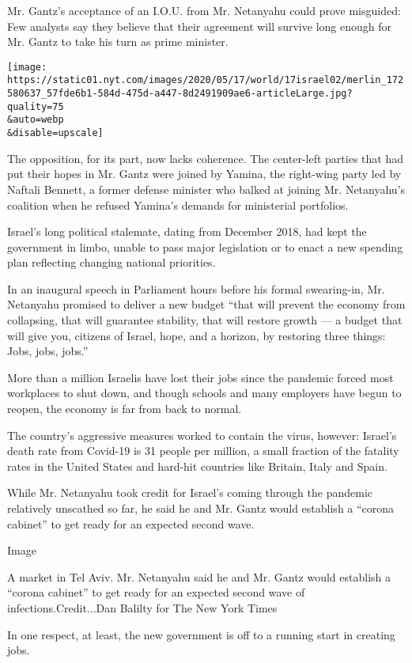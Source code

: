 Mr. Gantz's acceptance of an I.O.U. from Mr. Netanyahu could prove
misguided: Few analysts say they believe that their agreement will
survive long enough for Mr. Gantz to take his turn as prime minister.

\texttt{[image: https://static01.nyt.com/images/2020/05/17/world/17israel02/merlin\_172580637\_57fde6b1-584d-475d-a447-8d2491909ae6-articleLarge.jpg?quality=75\\\&auto=webp\\\&disable=upscale]}

The opposition, for its part, now lacks coherence. The center-left
parties that had put their hopes in Mr. Gantz were joined by Yamina, the
right-wing party led by Naftali Bennett, a former defense minister who
balked at joining Mr. Netanyahu's coalition when he refused Yamina's
demands for ministerial portfolios.

Israel's long political stalemate, dating from December 2018, had kept
the government in limbo, unable to pass major legislation or to enact a
new spending plan reflecting changing national priorities.

In an inaugural speech in Parliament hours before his formal
swearing-in, Mr. Netanyahu promised to deliver a new budget ``that will
prevent the economy from collapsing, that will guarantee stability, that
will restore growth --- a budget that will give you, citizens of Israel,
hope, and a horizon, by restoring three things: Jobs, jobs, jobs.''

More than a million Israelis have lost their jobs since the pandemic
forced most workplaces to shut down, and though schools and many
employers have begun to reopen, the economy is far from back to normal.

The country's aggressive measures worked to contain the virus, however:
Israel's death rate from Covid-19 is 31 people per million, a small
fraction of the fatality rates in the United States and hard-hit
countries like Britain, Italy and Spain.

While Mr. Netanyahu took credit for Israel's coming through the pandemic
relatively unscathed so far, he said he and Mr. Gantz would establish a
``corona cabinet'' to get ready for an expected second wave.

Image

A market in Tel Aviv. Mr. Netanyahu said he and Mr. Gantz would
establish a ``corona cabinet'' to get ready for an expected second wave
of infections.Credit...Dan Balilty for The New York Times

In one respect, at least, the new government is off to a running start
in creating jobs.

